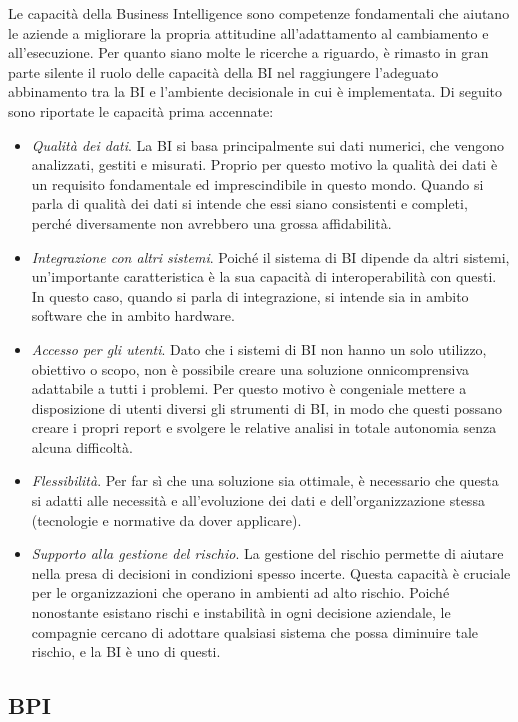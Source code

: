 Le capacità della Business Intelligence sono competenze fondamentali che aiutano le aziende a migliorare la propria attitudine all'adattamento al cambiamento e all'esecuzione. Per quanto siano molte le ricerche a riguardo, è rimasto in gran parte silente il ruolo delle capacità della BI nel raggiungere l'adeguato abbinamento tra la BI e l'ambiente decisionale in cui è implementata.
Di seguito sono riportate le capacità prima accennate:\cite{bi_capabilities}

\begin{itemize}
    \item \textit{Qualità dei dati}. La BI si basa principalmente sui dati numerici, che vengono analizzati, gestiti e misurati. Proprio per questo motivo la qualità dei dati è un requisito fondamentale ed imprescindibile in questo mondo. Quando si parla di qualità dei dati si intende che essi siano consistenti e completi, perché diversamente non avrebbero una grossa affidabilità.
    \item \textit{Integrazione con altri sistemi}. Poiché il sistema di BI dipende da altri sistemi, un'importante caratteristica è la sua capacità di interoperabilità con questi. In questo caso, quando si parla di integrazione, si intende sia in ambito software che in ambito hardware.
    \item \textit{Accesso per gli utenti}. Dato che i sistemi di BI non hanno un solo utilizzo, obiettivo o scopo, non è possibile creare una soluzione onnicomprensiva adattabile a tutti i problemi. Per questo motivo è congeniale mettere a disposizione di utenti diversi gli strumenti di BI, in modo che questi possano creare i propri report e svolgere le relative analisi in totale autonomia senza alcuna difficoltà.
    \item \textit{Flessibilità}. Per far sì che una soluzione sia ottimale, è necessario che questa si adatti alle necessità e all'evoluzione dei dati e dell'organizzazione stessa (tecnologie e normative da dover applicare).
    \item \textit{Supporto alla gestione del rischio}. La gestione del rischio permette di aiutare nella presa di decisioni in condizioni spesso incerte. Questa capacità è cruciale per le organizzazioni che operano in ambienti ad alto rischio. Poiché nonostante esistano rischi e instabilità in ogni decisione aziendale, le compagnie cercano di adottare qualsiasi sistema che possa diminuire tale rischio, e la BI è uno di questi.
\end{itemize}

\subsection{BPI}

